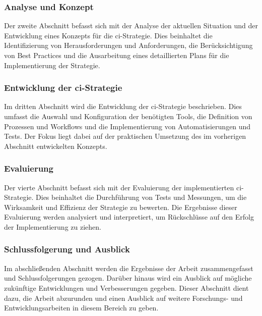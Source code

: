 \subsubsection{Analyse und Konzept}

Der zweite Abschnitt befasst sich mit der Analyse der aktuellen Situation und der Entwicklung eines Konzepts für die
\acrshort{ci}-Strategie.
Dies beinhaltet die Identifizierung von Herausforderungen und Anforderungen, die Berücksichtigung von Best Practices
und die Ausarbeitung eines detaillierten Plans für die Implementierung der Strategie.

\subsubsection{Entwicklung der \acrshort{ci}-Strategie}

Im dritten Abschnitt wird die Entwicklung der \acrshort{ci}-Strategie beschrieben.
Dies umfasst die Auswahl und Konfiguration der benötigten Tools, die Definition von Prozessen und Workflows und die
Implementierung von Automatisierungen und Tests.
Der Fokus liegt dabei auf der praktischen Umsetzung des im vorherigen Abschnitt entwickelten Konzepts.

\subsubsection{Evaluierung}

Der vierte Abschnitt befasst sich mit der Evaluierung der implementierten \acrshort{ci}-Strategie.
Dies beinhaltet die Durchführung von Tests und Messungen, um die Wirksamkeit und Effizienz der Strategie zu bewerten.
Die Ergebnisse dieser Evaluierung werden analysiert und interpretiert, um Rückschlüsse auf den Erfolg der
Implementierung zu ziehen.

\subsubsection{Schlussfolgerung und Ausblick}

Im abschließenden Abschnitt werden die Ergebnisse der Arbeit zusammengefasst und Schlussfolgerungen gezogen.
Darüber hinaus wird ein Ausblick auf mögliche zukünftige Entwicklungen und Verbesserungen gegeben.
Dieser Abschnitt dient dazu, die Arbeit abzurunden und einen Ausblick auf weitere Forschungs- und Entwicklungsarbeiten
in diesem Bereich zu geben.

\clearpage
